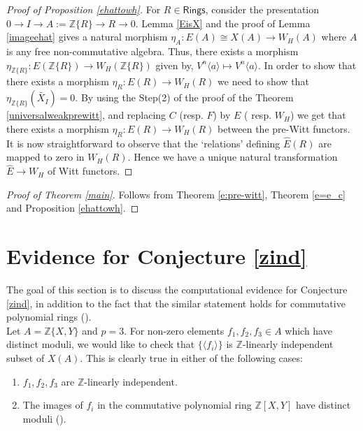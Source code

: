 \documentclass[11pt]{amsart}
\theoremstyle{plain}
\theoremstyle{definition}
\renewcommand{\tilde}{\widetilde}
\newcommand{\Z}{{\mathbb Z}}
\newcommand{\ab}[1]{\langle {#1} \rangle}
\newcommand{\ac}[1]{\{#1\}}
\newcommand{\Rings}{{\mathsf{Rings}}}
\begin{document}
\begin{proof}[Proof of Proposition \ref{ehattowh}]  For $R \in \Rings$, consider the presentation $0 \to I \to A:=\Z\ac{R} \to R \to 0$. Lemma \ref{EisX} and the proof of Lemma \ref{imageehat} gives a natural morphism $\eta_A: E(A) \cong X(A) \to W_H(A)$ where $A$ is any free non-commutative algebra. Thus, there exists a morphism $\eta_{\Z\{R\}}: E(\Z\{R\}) \to W_H(\Z\{R\})$ given by, $V^n\ab{a} \mapsto V^n\ab{a}$. In order to show that there exists a morphism $\eta_R: E(R) \to W_H(R)$ we need to show that $\eta_{\Z\{R\}}(\tilde{X_I}) = 0$. By using the Step(2) of the proof of the Theorem \ref{universalweakprewitt}, and replacing $C$ (resp. $F$) by $E$ ( resp. $W_H$) we get that there exists a morphism $\eta_R :  E(R) \to W_H(R)$ between the pre-Witt functors. It is now straightforward to observe that the `relations' defining $\hat{E}(R)$ are mapped to zero in $W_H(R)$. Hence we have a unique natural transformation $\hat{E} \to W_H$ of Witt functors. 
\end{proof}

\begin{proof}[Proof of Theorem \ref{main}]
Follows from  Theorem \ref{e:pre-witt}, Theorem \ref{e=e_c} and  Proposition \ref{ehattowh}. 
\end{proof} 

\section{Evidence for Conjecture \ref{zind}}\label{evidence}

The goal of this section is to discuss the computational evidence for Conjecture \ref{zind}, in addition to the fact that the similar statement holds for commutative polynomial rings (\cite[Lemma 4.2]{ps}).\\

\noindent Let $A = \Z\{X,Y\}$ and $p=3$. For non-zero elements $f_1, f_2, f_3\in A$ which have distinct moduli, we would like to check that $\{\ab{f_i} \}$ is $\Z$-linearly independent subset of $X(A)$. This is clearly true in either of the following cases:
\begin{enumerate}
\item $f_1, f_2, f_3$ are $\Z$-linearly independent.
\item The images of $f_i$ in the commutative polynomial ring $\Z[X,Y]$ have distinct moduli (\cite[Lemma 4.2]{ps}). 
\end{enumerate}
\end{document}
